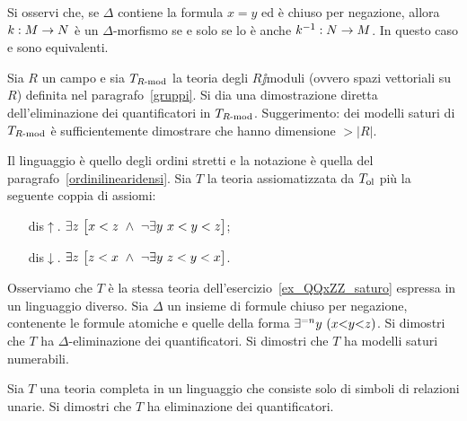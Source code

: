 Si osservi che, se $\Delta$ contiene la formula $x=y$ ed \`e chiuso per negazione, allora  $k:M\rightarrow N$ \`e un $\Delta$-morfismo se e solo se lo \`e anche $k^{-1}:N\rightarrow M$. In questo caso  e  sono equivalenti.



\begin{exercise}\label{EQ_stazi_vettoriali}
Sia $R$ un campo e sia $T_{\mbox{\scriptsize $R$-mod}}$ la teoria degli $R\jj$moduli (ovvero spazi vettoriali su $R$) definita nel paragrafo~\ref{gruppi}. Si dia una dimostrazione diretta dell'eliminazione dei quantificatori in $T_{\mbox{\scriptsize $R$-mod}}$. Suggerimento: dei modelli saturi di $T_{\mbox{\scriptsize $R$-mod}}$ \`e sufficientemente dimostrare che hanno dimensione $>|R|$.
\end{exercise}


\begin{exercise}
Il linguaggio \`e quello degli ordini stretti e la notazione \`e quella del paragrafo~\ref{ordinilinearidensi}. Sia $T$ la teoria assiomatizzata da $T_{\rm ol}$ pi\`u la seguente coppia di assiomi:
\begin{itemize}
\item[dis$\uparrow$.] $\E z\ \big[x<z\ \wedge\ \neg\E y\ x<y<z\big]$;
\item[dis$\downarrow$.] $\E z\ \big[ z<x\ \wedge\ \neg\E y\ z<y<x\big]$.
\end{itemize}
Osserviamo che $T$ \`e la stessa teoria dell'esercizio~\ref{ex_QQxZZ_saturo} espressa in un linguaggio diverso. Sia $\Delta$ un insieme di formule chiuso per negazione, contenente le formule atomiche e quelle della forma $\E^{=n}y\ (x\mathord<y\mathord<z)$. Si dimostri che $T$ ha $\Delta$-eliminazione dei quantificatori. Si dimostri che $T$ ha modelli saturi numerabili.\QED
\end{exercise}


\begin{exercise}
Sia $T$ una teoria completa in un linguaggio che consiste solo di simboli di relazioni unarie. Si dimostri che $T$ ha eliminazione dei quantificatori.\QED
\end{exercise}

